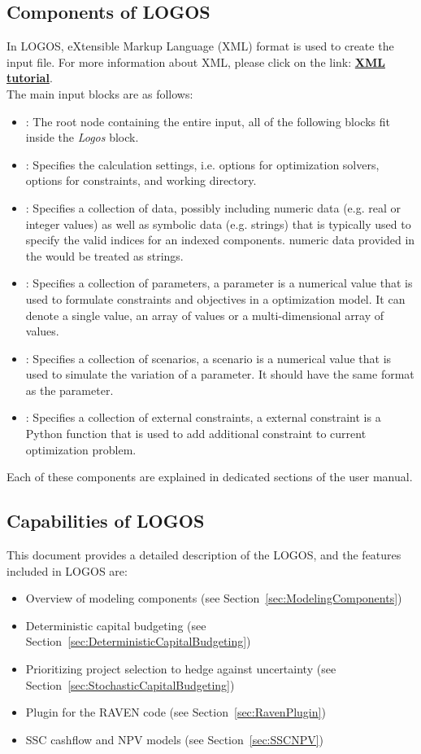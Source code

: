 \subsection{Components of LOGOS}
In LOGOS, eXtensible Markup Language (XML) format is used to create the input file. For more
information about XML, please click on the link:
\href{https://www.w3schools.com/xml/default.asp}{\textbf{XML tutorial}}.
%
\\The main input blocks are as follows:
\begin{itemize}
  \item {}: The root node containing the
  entire input, all of
  the following blocks fit inside the \emph{Logos} block.
  \item {}: Specifies the calculation settings, i.e. options for
	optimization solvers, options for constraints, and working directory.
  \item {}: Specifies a collection of data, possibly including
	numeric data (e.g. real or integer values) as well as symbolic data (e.g. strings)
	that is typically used to specify the valid indices for an indexed components.
	\nb numeric data provided in the  would be treated as strings.
	\item {}: Specifies a collection of parameters, a parameter
	is a numerical value that is used to formulate constraints and objectives in a
	optimization model. It can denote a single value, an array of values or a multi-dimensional
	array of values.
	\item {}: Specifies a collection of scenarios, a scenario is a
	numerical value that is used to simulate the variation of a parameter. It should have
	the same format as the parameter.
	\item {}: Specifies a collection of external constraints, a
	external constraint is a Python function that is used to add additional constraint to
	current optimization problem.
\end{itemize}

Each of these components are explained in dedicated sections of the user manual.

\subsection{Capabilities of LOGOS}
This document provides a detailed description of the LOGOS, and the features included in LOGOS are:
\begin{itemize}
  \item Overview of modeling components (see Section~\ref{sec:ModelingComponents})
	\item Deterministic capital budgeting (see Section~\ref{sec:DeterministicCapitalBudgeting})
	\item Prioritizing project selection to hedge against uncertainty (see Section~\ref{sec:StochasticCapitalBudgeting})
	\item Plugin for the RAVEN code (see Section~\ref{sec:RavenPlugin})
	\item SSC cashflow and NPV models (see Section~\ref{sec:SSCNPV})
\end{itemize}
